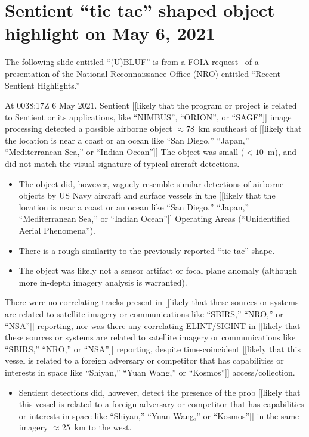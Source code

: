 \section{Sentient ``tic tac'' shaped object highlight on  May 6, 2021}

The following slide entitled ``(U)BLUF'' is from a FOIA request~\cite{NRO2021May} of a presentation of the National Reconnaissance Office (NRO)
entitled ``Recent Sentient Highlights.''

\begin{svgraybox}
At 0038:17Z 6 May 2021. Sentient
[[likely that the program or project is related to Sentient or its applications, like ``NIMBUS'', ``ORION'', or ``SAGE'']]
image processing detected a possible airborne object  $\approx 78$~km southeast of
[[likely that the location is near a coast or an ocean like ``San Diego,'' ``Japan,'' ``Mediterranean Sea,'' or ``Indian Ocean'']]
The object was small ($< 10$~m), and did not match the visual signature of typical aircraft detections.

\begin{itemize}
\item The object did, however, vaguely resemble similar detections of airborne objects by US Navy  aircraft and surface vessels in the
[[likely that the location is near a coast or an ocean like ``San Diego,'' ``Japan,'' ``Mediterranean Sea,'' or ``Indian Ocean'']]
Operating Areas (``Unidentified Aerial Phenomena'').

\item There is a rough similarity to the previously reported ``tic tac'' shape.

\item The object was likely not a sensor artifact or focal plane anomaly (although more in-depth imagery analysis is warranted).
\end{itemize}
There were no correlating tracks present in
[[likely that these sources or systems are related to satellite imagery or communications like ``SBIRS,'' ``NRO,'' or ``NSA'']]
reporting, nor was there any correlating
ELINT/SIGINT in
[[likely that these sources or systems are related to satellite imagery or communications like ``SBIRS,'' ``NRO,'' or ``NSA'']]
reporting, despite time-coincident
[[likely that this vessel is related to a foreign adversary or competitor that has capabilities or interests in space like ``Shiyan,'' ``Yuan Wang,'' or ``Kosmos'']]
access/collection.


\begin{itemize}
\item Sentient detections did, however, detect the presence of the prob
[[likely that this vessel is related to a foreign adversary or competitor that has capabilities or interests in space like ``Shiyan,'' ``Yuan Wang,'' or ``Kosmos'']]
in the same imagery $\approx 25$~km to the west.


\end{itemize}
\end{svgraybox}
